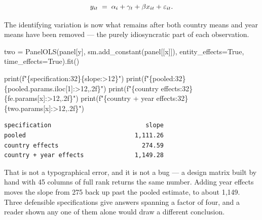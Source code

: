 \documentclass[
  letterpaper,
  10pt,
  twoside,
  openright,
  numbers=noenddot,
  chapterprefix=true]{scrbook}
\newenvironment{Shaded}{}{}
\newcommand{\BuiltInTok}[1]{\textcolor[rgb]{0.84,0.23,0.29}{#1}}
\newcommand{\DecValTok}[1]{\textcolor[rgb]{0.00,0.36,0.77}{#1}}
\newcommand{\NormalTok}[1]{\textcolor[rgb]{0.14,0.16,0.18}{#1}}
\newcommand{\OperatorTok}[1]{\textcolor[rgb]{0.14,0.16,0.18}{#1}}
\newcommand{\SpecialCharTok}[1]{\textcolor[rgb]{0.00,0.36,0.77}{#1}}
\newcommand{\SpecialStringTok}[1]{\textcolor[rgb]{0.01,0.18,0.38}{#1}}
\newcommand{\StringTok}[1]{\textcolor[rgb]{0.01,0.18,0.38}{#1}}
\newcommand{\VariableTok}[1]{\textcolor[rgb]{0.89,0.38,0.04}{#1}}
\begin{document}
\[
y_{it} \thickspace=\thickspace \alpha_i + \gamma_t + \beta x_{it} + \varepsilon_{it} .
\]

The identifying variation is now what remains after both country means
and year means have been removed --- the purely idiosyncratic part of
each observation.

\label{check-twoway}
\begin{Shaded}
\begin{Highlighting}[]
\NormalTok{two }\OperatorTok{=}\NormalTok{ PanelOLS(panel[y], sm.add\_constant(panel[[x]]),}
\NormalTok{               entity\_effects}\OperatorTok{=}\VariableTok{True}\NormalTok{, time\_effects}\OperatorTok{=}\VariableTok{True}\NormalTok{).fit()}

\BuiltInTok{print}\NormalTok{(}\SpecialStringTok{f"}\SpecialCharTok{\{}\StringTok{\textquotesingle{}specification\textquotesingle{}}\SpecialCharTok{:32\}\{}\StringTok{\textquotesingle{}slope\textquotesingle{}}\SpecialCharTok{:\textgreater{}12\}}\SpecialStringTok{"}\NormalTok{)}
\BuiltInTok{print}\NormalTok{(}\SpecialStringTok{f"}\SpecialCharTok{\{}\StringTok{\textquotesingle{}pooled\textquotesingle{}}\SpecialCharTok{:32\}\{}\NormalTok{pooled}\SpecialCharTok{.}\NormalTok{params}\SpecialCharTok{.}\NormalTok{iloc[}\DecValTok{1}\NormalTok{]}\SpecialCharTok{:\textgreater{}12,.2f\}}\SpecialStringTok{"}\NormalTok{)}
\BuiltInTok{print}\NormalTok{(}\SpecialStringTok{f"}\SpecialCharTok{\{}\StringTok{\textquotesingle{}country effects\textquotesingle{}}\SpecialCharTok{:32\}\{}\NormalTok{fe}\SpecialCharTok{.}\NormalTok{params[x]}\SpecialCharTok{:\textgreater{}12,.2f\}}\SpecialStringTok{"}\NormalTok{)}
\BuiltInTok{print}\NormalTok{(}\SpecialStringTok{f"}\SpecialCharTok{\{}\StringTok{\textquotesingle{}country + year effects\textquotesingle{}}\SpecialCharTok{:32\}\{}\NormalTok{two}\SpecialCharTok{.}\NormalTok{params[x]}\SpecialCharTok{:\textgreater{}12,.2f\}}\SpecialStringTok{"}\NormalTok{)}
\end{Highlighting}
\end{Shaded}

\begin{verbatim}
specification                          slope
pooled                              1,111.26
country effects                       274.59
country + year effects              1,149.28
\end{verbatim}

That is not a typographical error, and it is not a bug --- a design
matrix built by hand with 45 columns of full rank returns the same
number. Adding year effects moves the slope from 275 back up past the
pooled estimate, to about 1,149. Three defensible specifications give
answers spanning a factor of four, and a reader shown any one of them
alone would draw a different conclusion.
\end{document}
